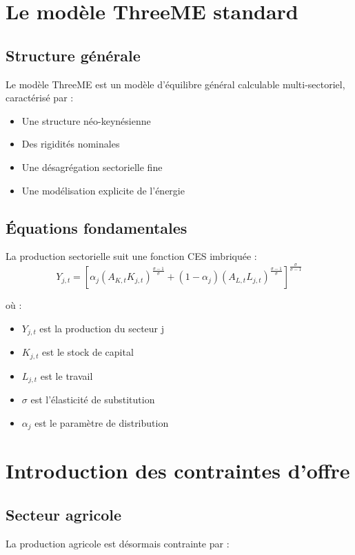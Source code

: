 \section{Le modèle ThreeME standard}

\subsection{Structure générale}
Le modèle ThreeME est un modèle d'équilibre général calculable multi-sectoriel, caractérisé par :
\begin{itemize}
    \item Une structure néo-keynésienne
    \item Des rigidités nominales
    \item Une désagrégation sectorielle fine
    \item Une modélisation explicite de l'énergie
\end{itemize}

\subsection{Équations fondamentales}
La production sectorielle suit une fonction CES imbriquée :
\begin{equation}
Y_{j,t} = \left[\alpha_j(A_{K,t}K_{j,t})^{\frac{\sigma-1}{\sigma}} + 
(1-\alpha_j)(A_{L,t}L_{j,t})^{\frac{\sigma-1}{\sigma}}\right]^{\frac{\sigma}{\sigma-1}}
\end{equation}

où :
\begin{itemize}
    \item $Y_{j,t}$ est la production du secteur j
    \item $K_{j,t}$ est le stock de capital
    \item $L_{j,t}$ est le travail
    \item $\sigma$ est l'élasticité de substitution
    \item $\alpha_j$ est le paramètre de distribution
\end{itemize}

\section{Introduction des contraintes d'offre}

\subsection{Secteur agricole}
La production agricole est désormais contrainte par :

